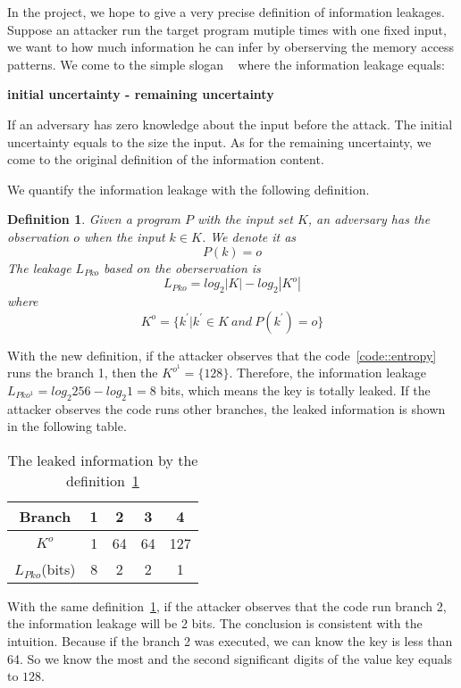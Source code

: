 In the project, we hope to give a very precise definition of information leakages. 
Suppose an attacker run the target program mutiple times with one fixed input, we
want to how much information he can infer by oberserving the memory access patterns.
We come to the simple slogan ~\cite{10.1007/978-3-642-00596-1_21} where the information
leakage equals:

\textbf{initial uncertainty - remaining uncertainty}

If an adversary has zero knowledge about the input before the attack. The initial uncertainty
equals to the size the input. As for the remaining uncertainty, we come to the original definition
of the information content.

We quantify the information leakage with the following definition. 

\newtheorem{mydef}{Definition}

\begin{mydef}
\label{def}
Given a program $P$ with the input set $K$, 
an adversary has the observation $o$ when the input $k{\in}K$. 
We denote it as
    $$P(k) = o$$
The leakage $L_{Pko}$ based on the oberservation is
    $$L_{Pko} = log_2{|K|} - log_2{|K^o|}$$
    where
    $$K^o = \{k^{'} | k^{'}{\in}K \ and \ P(k^{'}) = o \}$$
\end{mydef}

With the new definition, if the attacker observes that the code~\ref{code::entropy} runs the branch 1, 
then the $K^{o^{1}} = \{128\}$. Therefore, the information leakage $L_{Pko^{1}} = log_2{256} - log_2{1} = 8$
bits, which means the key is totally leaked. If the attacker observes the code runs other
branches, the leaked information is shown in the following table.

\begin{table}[h]
    \centering
    \begin{tabular}{|c|c|c|c|c|}
    \hline
    Branch & 1 & 2  & 3  & 4   \\ \hline
    $K^o$   & 1 & 64 & 64 & 127 \\ \hline
    $L_{Pko}$(bits)   & 8 & 2  & 2  & 1   \\ \hline
    \end{tabular}
    \caption{The leaked information by the definition~\ref{def}}
\end{table}

With the same definition~\ref{def}, if the attacker observes that the code run branch 2, the information
leakage will be 2 bits. The conclusion is consistent with the intuition. Because if the branch 2 was
executed, we can know the key is less than 64. So we know the most and the second significant digits of 
the value key equals to $128$.

